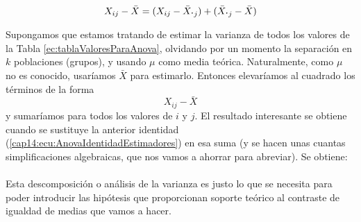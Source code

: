 \begin{itemize}
        \begin{equation}\label{cap14:ecu:AnovaIdentidadEstimadores}
        X_{ij}-\bar X=(X_{ij}-\bar X_{\mbox{\bf\large $\cdot$}j})+(\bar X_{\mbox{\bf\large $\cdot$}j}-\bar X)
        \end{equation}

        Supongamos que estamos tratando de estimar la varianza de todos los valores de la Tabla \ref{ec:tablaValoresParaAnova},  olvidando por un momento la separación en $k$ poblaciones (grupos), y usando $\mu$ como media teórica. Naturalmente, como $\mu$ no es conocido, usaríamos $\bar X$ para estimarlo. Entonces elevaríamos al cuadrado los términos de la forma
        \[X_{ij}-\bar X\]
        y sumaríamos para todos los valores de $i$ y $j$. El resultado interesante  se obtiene cuando se sustituye la anterior identidad (\ref{cap14:ecu:AnovaIdentidadEstimadores}) en esa suma (y se hacen unas cuantas simplificaciones algebraicas, que nos vamos a ahorrar para abreviar). Se obtiene:\\[3mm]
        \\[3mm]
        Esta descomposición o análisis de la varianza es justo lo que se necesita para poder introducir las hipótesis que proporcionan soporte teórico al contraste de igualdad de medias que vamos a hacer.

\end{itemize}

